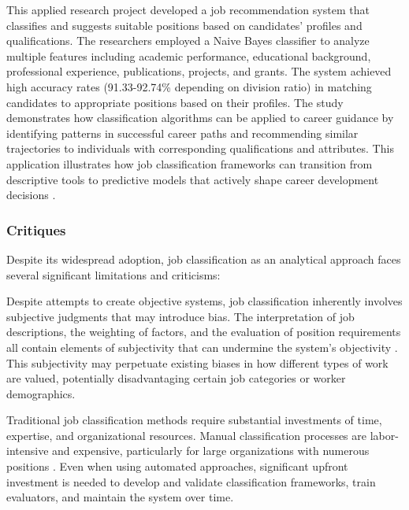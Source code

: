 \documentclass[../main.tex]{subfiles}
\begin{document}
This applied research project developed a job recommendation system that classifies and suggests suitable positions based on candidates' profiles and qualifications. The researchers employed a Naive Bayes classifier to analyze multiple features including academic performance, educational background, professional experience, publications, projects, and grants. The system achieved high accuracy rates (91.33-92.74\% depending on division ratio) in matching candidates to appropriate positions based on their profiles. The study demonstrates how classification algorithms can be applied to career guidance by identifying patterns in successful career paths and recommending similar trajectories to individuals with corresponding qualifications and attributes. This application illustrates how job classification frameworks can transition from descriptive tools to predictive models that actively shape career development decisions \parencite{jeesr2021}.

\subsubsection{Critiques}

Despite its widespread adoption, job classification as an analytical approach faces several significant limitations and criticisms:

Despite attempts to create objective systems, job classification inherently involves subjective judgments that may introduce bias. The interpretation of job descriptions, the weighting of factors, and the evaluation of position requirements all contain elements of subjectivity that can undermine the system's objectivity \parencite{haygroup2024}. This subjectivity may perpetuate existing biases in how different types of work are valued, potentially disadvantaging certain job categories or worker demographics.

Traditional job classification methods require substantial investments of time, expertise, and organizational resources. Manual classification processes are labor-intensive and expensive, particularly for large organizations with numerous positions \parencite{ikudo2018}. Even when using automated approaches, significant upfront investment is needed to develop and validate classification frameworks, train evaluators, and maintain the system over time.
\end{document}
